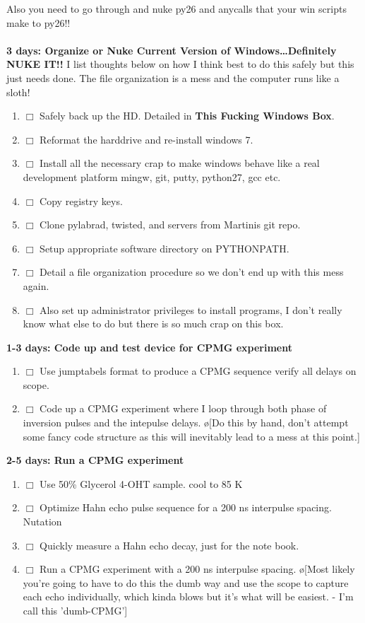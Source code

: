 \documentclass[10pt]{book}
\begin{document}
{Also you need to go through and nuke py26 and anycalls that your win scripts make to py26!! \\ \\

{\bf 3 days: Organize or Nuke Current Version of Windows\ldots Definitely NUKE IT!!}
I list thoughts below on how I think best to do this safely but this just needs done. The file organization is a mess and the computer runs like a sloth!
\begin{enumerate}
    \item $\Box$ Safely back up the HD. Detailed in {\bf This Fucking Windows Box}.
    \item $\Box$ Reformat the harddrive and re-install windows 7.
    \item $\Box$ Install all the necessary crap to make windows behave like a real development platform mingw, git, putty, python27, gcc etc.
    \item $\Box$ Copy registry keys.
    \item $\Box$ Clone pylabrad, twisted, and servers from Martinis git repo.
    \item $\Box$ Setup appropriate software directory on PYTHONPATH.
    \item $\Box$ Detail a file organization procedure so we don't end up with this mess again.
    \item $\Box$ Also set up administrator privileges to install programs, I don't really know what else to do but there is so much crap on this box.\\
\end{enumerate}


{\bf 1-3 days: Code up and test device for CPMG experiment}
\begin{enumerate}
    \item $\Box$ Use jumptabels format to produce a CPMG sequence verify all delays on scope.
    \item $\Box$ Code up a CPMG experiment where I loop through both phase of inversion pulses and the intepulse delays. \o[Do this by hand, don't attempt some fancy code structure as this will inevitably lead to a mess at this point.]{}\\
\end{enumerate}


{\bf 2-5 days: Run a CPMG experiment}
\begin{enumerate}
    \item $\Box$ Use 50\% Glycerol 4-OHT sample. cool to 85 K
    \item $\Box$ Optimize Hahn echo pulse sequence for a 200 ns interpulse spacing. Nutation
    \item $\Box$ Quickly measure a Hahn echo decay, just for the note book.
    \item $\Box$ Run a CPMG experiment with a 200 ns interpulse spacing. \o[Most likely you're going to have to do this the dumb way and use the scope to capture each echo individually, which kinda blows but it's what will be easiest. - I'm call this 'dumb-CPMG']{}\\
\end{enumerate}

}
\end{document}
